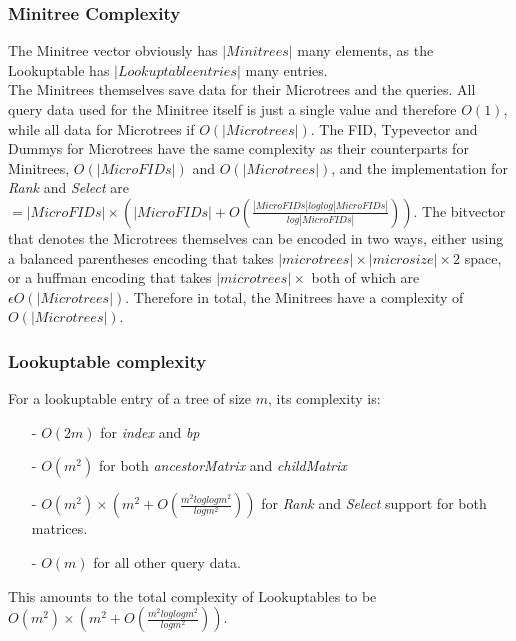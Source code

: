 \documentclass{article}
\begin{document}
\subsubsection{Minitree Complexity}
The Minitree vector obviously has $|Minitrees|$ many elements, as the Lookuptable has $|Lookuptable entries|$ many entries.\\
The Minitrees themselves save data for their Microtrees and the queries. All query data used for the Minitree itself is just a single value and therefore $O(1)$, while all data for Microtrees if $O(|Microtrees|)$. The FID, Typevector and Dummys for Microtrees have the same complexity as their counterparts for Minitrees, $O(|Micro FIDs|)$ and $O(|Microtrees|)$, and the implementation for \textit{Rank} and \textit{Select} are $= |MicroFIDs| \times (|MicroFIDs| + O(\frac{|MicroFIDs| log log |MicroFIDs|}{log |MicroFIDs|}))$. The bitvector that denotes the Microtrees themselves can be encoded in two ways, either using a balanced parentheses encoding that takes $|microtrees| \times |microsize| \times 2$ space, or a huffman encoding that takes $|microtrees| \times$ %
both of which are $\epsilon O(|Microtrees|)$.
Therefore in total, the Minitrees have a complexity of $O(|Microtrees|)$.
\subsubsection{Lookuptable complexity}
For a lookuptable entry of a tree of size $m$, its complexity is:
\begin{itemize}
	\item[-] $O(2m)$ for \textit{index} and \textit{bp}
	\item[-] $O(m^{2})$ for both \textit{ancestorMatrix} and \textit{childMatrix}
	\item[-] $O(m^{2}) \times (m^{2} + O(\frac{m^{2} log log m^{2}}{log m^{2}}))$ for \textit{Rank} and \textit{Select} support for both matrices.
	\item[-] $O(m)$ for all other query data.
\end{itemize}
This amounts to the total complexity of Lookuptables to be $O(m^{2}) \times (m^{2} + O(\frac{m^{2} log log m^{2}}{log m^{2}}))$.
\end{document}
